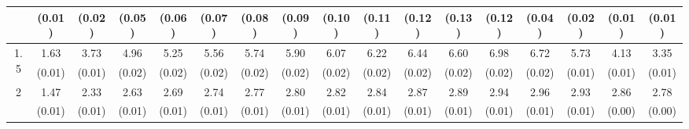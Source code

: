 \documentclass[12pt]{article}  %
\theoremstyle{plain}
\begin{document}
\begin{sidewaystable}[htbp]
\begin{tabular}{ccccccccccccccccc}
                      &  (0.01)& (0.02)& (0.05)& (0.06)& (0.07)& (0.08)& (0.09)& (0.10)& (0.11)&  (0.12)&  (0.13)&  (0.12)&  (0.04)&  (0.02)&  (0.01)&     (0.01)\\ \hline                                                                                                                                                                                                                                                                                    
\multirow{2}{*}{1.5}  &1.63 &3.73  &4.96 & 5.25  & 5.56 &  5.74  & 5.90 &  6.07  & 6.22 &  6.44  & 6.60 & 6.98 & 6.72& 5.73& 4.13& 3.35\\
                      &  (0.01)& (0.01)& (0.02)& (0.02)& (0.02)&(0.02)& (0.02)& (0.02)& (0.02)&  (0.02)&  (0.02)&  (0.02)&  (0.02)&  (0.01)&  (0.01)&     (0.01)\\ \hline                                                                                                                                                                                                                                                                                    
\multirow{2}{*}{2}  & 1.47 &2.33 & 2.63 & 2.69 &  2.74  & 2.77  & 2.80 &  2.82 &  2.84  & 2.87  & 2.89 & 2.94 & 2.96& 2.93& 2.86& 2.78\\
                      &  (0.01)& (0.01)& (0.01)& (0.01)& (0.01)& (0.01)& (0.01)& (0.01)& (0.01)&  (0.01)&  (0.01)&  (0.01)&  (0.01)&  (0.01)&  (0.00)   &(0.00)\\ \hline                                                                                                                                                                                                                                                                                    
\end{tabular}
\end{sidewaystable}
\end{document}
